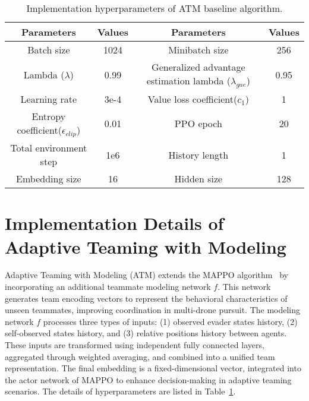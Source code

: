\begin{table}[t]
        \centering
        \caption{Implementation hyperparameters of ATM baseline algorithm.}
        \begin{tabular}{@{}cc|cc@{}}
            \toprule
            \textbf{Parameters} & \textbf{Values} & \textbf{Parameters} & \textbf{Values}\\ \midrule
            Batch size & 1024 & Minibatch size & 256\\ 
            Lambda (\(\lambda\)) & 0.99  & Generalized advantage estimation lambda (\(\lambda_{gae}\)) & 0.95\\ 
            Learning rate & 3e-4 & Value loss coefficient($c_1$) & 1 \\ 
            Entropy coefficient(\(\epsilon_{clip}\)) & 0.01 & PPO epoch & 20 \\ 
            Total environment step & 1e6 &  History length & 1 \\ 
            Embedding size & 16 & Hidden size & 128 \\
            \bottomrule
        \end{tabular}
        \label{tab:ATM_params}
    \end{table}


\section{Implementation Details of Adaptive Teaming with Modeling}
\label{appendix:atm}

Adaptive Teaming with Modeling (ATM) extends the MAPPO algorithm~\cite{yu2022surprising} by incorporating an additional teammate modeling network \( f \). 
This network generates team encoding vectors to represent the behavioral characteristics of unseen teammates, improving coordination in multi-drone pursuit.
The modeling network \( f \) processes three types of inputs: (1) observed evader states history, (2) self-observed states history, and (3) relative positions history between agents. These inputs are transformed using independent fully connected layers, aggregated through weighted averaging, and combined into a unified team representation. The final embedding is a fixed-dimensional vector, integrated into the actor network of MAPPO to enhance decision-making in adaptive teaming scenarios.
The details of hyperparameters are listed in Table~\ref{tab:ATM_params}.



